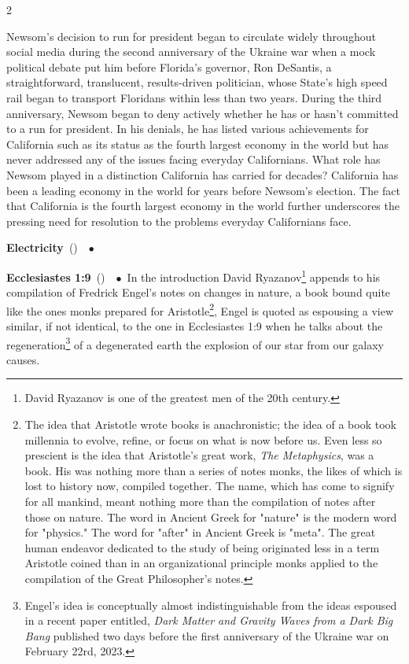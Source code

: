 \documentclass[10pt,a4paper,twoside]{article} %
\newcommand{\entry}[4]{\markboth{#1}{#1}\textbf{#1}\ {(#2)}\ \textit{#3}\ $\bullet$\ {#4}}  %
\begin{document}
\begin{multicols}{2}
{\newline \indent Newsom's decision to run for president began to circulate widely throughout social media during the second anniversary of the Ukraine war when a mock political debate put him before Florida's governor, Ron DeSantis, a straightforward, translucent, results-driven politician, whose State's high speed rail began to transport Floridans within less than two years. During the third anniversary, Newsom began to deny actively whether he has or hasn't committed to a run for president. In his denials, he has listed various achievements for California such as its status as the fourth largest economy in the world but has never addressed any of the issues facing everyday Californians.  What role has Newsom played in a distinction California has carried for decades? California has been a leading economy in the world for years before Newsom's election. The fact that California is the fourth largest economy in the world further underscores the pressing need for resolution to the problems everyday Californians face.

} 

\entry{Electricity} {} {} {}

\entry{Ecclesiastes 1:9} {} {} {In the introduction David Ryazanov\footnote{David Ryazanov is one of the greatest men of the 20th century.} appends to his compilation of Fredrick Engel's notes on changes in nature, a book bound quite like the ones monks prepared for Aristotle\footnote{The idea that Aristotle wrote books is anachronistic; the idea of a book took millennia to evolve, refine, or focus on what is now before us. Even less so prescient is the idea that Aristotle's great work, \emph{The Metaphysics}, was a book. His was nothing more than a series of notes monks, the likes of which is lost to history now, compiled together. The name, which has come to signify for all mankind, meant nothing more than the compilation of notes after those on nature. The word in Ancient Greek for "nature" is the modern word for "physics." The word for "after" in Ancient Greek is "meta". The great human endeavor dedicated to the study of being originated less in a term Aristotle coined than in an organizational principle monks applied to the compilation of the Great Philosopher's notes.}, Engel is quoted as espousing a view similar, if not identical, to the one in Ecclesiastes 1:9 when he talks about the regeneration\footnote{Engel's idea is conceptually almost indistinguishable from the ideas espoused in a recent paper entitled, \emph{Dark Matter and Gravity Waves from a Dark Big Bang} published two days before the first anniversary of the Ukraine war on February 22rd, 2023.} of a degenerated earth the explosion of our star from our galaxy causes.}


\end{multicols}
\end{document}
